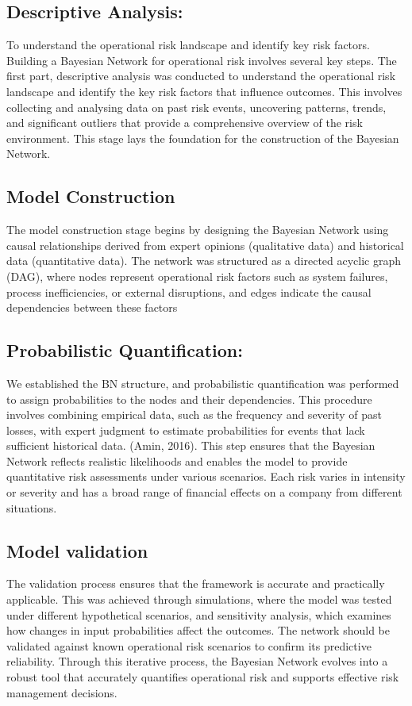 \subsection{Descriptive Analysis: }
To understand the operational risk landscape and identify key risk factors. Building a Bayesian Network for operational risk involves several key steps.  The first part, descriptive analysis was conducted to understand the operational risk landscape and identify the key risk factors that influence outcomes. This involves collecting and analysing data on past risk events, uncovering patterns, trends, and significant outliers that provide a comprehensive overview of the risk environment. This stage lays the foundation for the construction of the Bayesian Network.
\subsection{Model Construction}
The model construction stage begins by designing the Bayesian Network using causal relationships derived from expert opinions (qualitative data) and historical data (quantitative data). The network was structured as a directed acyclic graph (DAG), where nodes represent operational risk factors such as system failures, process inefficiencies, or external disruptions, and edges indicate the causal dependencies between these factors
\subsection{Probabilistic Quantification:} 
We established the BN structure, and probabilistic quantification was performed to assign probabilities to the nodes and their dependencies. This procedure involves combining empirical data, such as the frequency and severity of past losses, with expert judgment to estimate probabilities for events that lack sufficient historical data. (Amin, 2016). This step ensures that the Bayesian Network reflects realistic likelihoods and enables the model to provide quantitative risk assessments under various scenarios. Each risk varies in intensity or severity and has a broad range of financial effects on a company from different situations.
\subsection{Model validation}
The validation process ensures that the framework is accurate and practically applicable. This was achieved through simulations, where the model was tested under different hypothetical scenarios, and sensitivity analysis, which examines how changes in input probabilities affect the outcomes. The network should be validated against known operational risk scenarios to confirm its predictive reliability. Through this iterative process, the Bayesian Network evolves into a robust tool that accurately quantifies operational risk and supports effective risk management decisions. 
